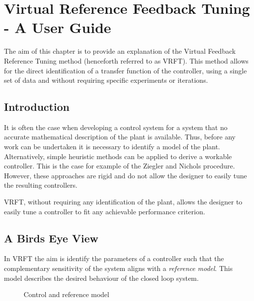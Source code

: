 
\chapter{Virtual Reference Feedback Tuning - A User Guide}
\label{chap:vrft}

\newcommand{\thetavec}{\underline{\theta}}
\newcommand{\thetaveco}{\underline{\theta_o}}
\newcommand{\thetaveci}{\underline{\theta_i}}

The aim of this chapter is to provide an explanation of the Virtual Feedback Reference Tuning method (henceforth referred to as VRFT). This method allows for the direct identification of a transfer function of the controller, using a single set of data and without requiring specific experiments or iterations. 

\section{Introduction}
\label{sec:vrft_introduction}

It is often the case when developing a control system for a system that no accurate mathematical description of the plant is available. Thus, before any work can be undertaken it is necessary to identify a model of the plant. Alternatively, simple heuristic methods can be applied to derive a workable controller. This is the case for example of the Ziegler and Nichols procedure. However, these approaches are rigid and do not allow the designer to easily tune the resulting controllers. 

VRFT, without requiring any identification of the plant, allows the designer to easily tune a controller to fit any achievable performance criterion.

\section{A Birds Eye View}
\label{sec:vrft_birds_eye_view}

In VRFT the aim is identify the parameters of a controller such that the complementary sensitivity of the system aligns with a \emph{reference model}. This model describes the desired behaviour of the closed loop system. 

\begin{figure}[!ht]
    

    \caption{Control and reference model}
    \label{fig:vrft_bd}
\end{figure}

